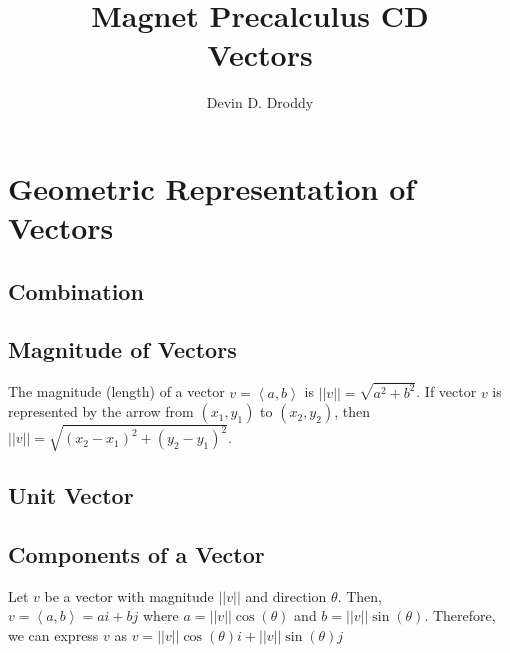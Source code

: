 \documentclass{report}
\title{\Huge{Magnet Precalculus CD}\\Vectors}
\author{\huge{Devin D. Droddy}}
\date{}
\begin{document}
\maketitle
\newpage%
\tableofcontents
\pagebreak

\chapter{Geometric Representation of Vectors}

\section{Combination }

\section{Magnitude of Vectors}

The magnitude (length) of a vector $v=\left\langle a,b \right\rangle$ is $||v||=\sqrt{a^2+b^2}$. If vector $v$ is represented by the arrow from $(x_1,y_1)$ to $(x_2,y_2)$, then $||v||=\sqrt{(x_2-x_1)^2+(y_2-y_1)^2}$.

\section{Unit Vector}


\section{Components of a Vector}

Let $v$ be a vector with magnitude $||v||$ and direction $\theta$. Then, $v=\left\langle a,b \right\rangle=ai+bj$ where $a=||v||\cos(\theta)$ and $b=||v||\sin(\theta)$. Therefore, we can express $v$ as $v=||v||\cos(\theta)i+||v||\sin(\theta)j$
\end{document}
